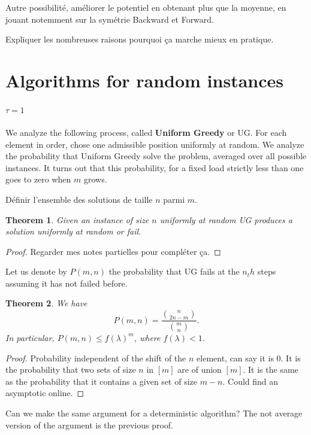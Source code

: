 \documentclass[10pt, conference, letterpaper]{IEEEtran}
\newtheorem{theorem}{Theorem}
\begin{document}
Autre possibilité, améliorer le potentiel en obtenant plus que la moyenne, en jouant notemment sur la symétrie Backward et Forward.

Expliquer les nombreuses raisons pourquoi ça marche mieux en pratique.




\section{Algorithms for random instances}

\paragraph{$\tau = 1$}

We analyze the following process, called \textbf{Uniform Greedy} or UG.
For each element in order, chose one admissible position
uniformly at random. We analyze the probability that Uniform Greedy
solve the problem, averaged over all possible instances. 
It turns out that this probability, for a fixed load strictly less than one goes to zero when $m$ grows. 

Définir l'ensemble des solutions de taille $n$ parmi $m$.
\begin{theorem}
Given an instance of size $n$ uniformly at random UG
produces a solution uniformly at random or fail.
\end{theorem}
\begin{proof}
Regarder mes notes partielles pour compléter ça.
\end{proof}

Let us denote by $P(m,n)$ the probability that UG fails at the $n_th$
steps assuming it has not failed before.

\begin{theorem}
We have $$P(m,n) = \frac{\binom{n}{2n-m}}{\binom{m}{n}}.$$
In particular, $P(m,n) \leq f(\lambda)^m$, where $f(\lambda) < 1$.
\end{theorem}
\begin{proof}
Probability independent of the shift of the $n$ element, can say it is $0$.
It is the probability that two sets of size $n$ in $[m]$ are of union $[m]$.
It is the same as the probability that it contains a given set of size $m-n$.
Could find an asymptotic online.
\end{proof}

Can we make the same argument for a deterministic algorithm?
The not average version of the argument is the previous proof.
\end{document}
